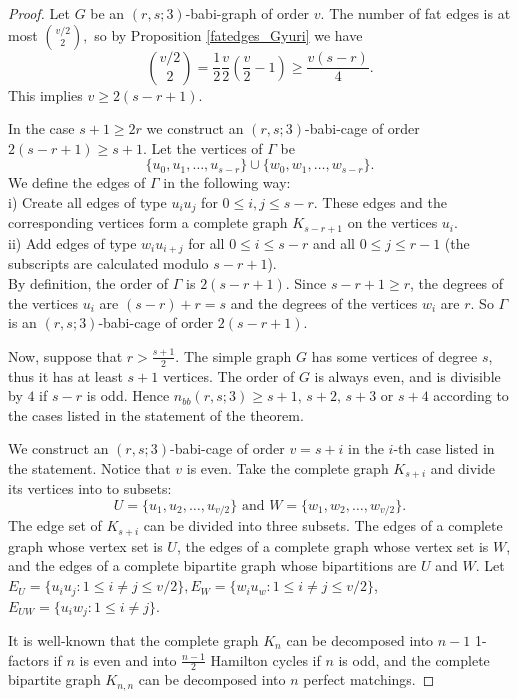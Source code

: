 \documentclass[a4paper,11pt]{article}
\begin{document}
\begin{proof}
Let $G$ be an $(r,s;3)$-babi-graph of order $v.$ 
The number of fat edges is at most ${v/2 \choose 2},$ so by Proposition
\ref{fatedges_Gyuri} we have 
$${v/2 \choose 2}=\frac{1}{2}\frac{v}{2}\left( \frac{v}{2}-1\right) \geq \frac{v(s-r)}{4}.$$
This implies $v\geq 2(s-r+1).$

In the case $s+1 \geq 2r$ we construct an $(r,s;3)$-babi-cage of order $2(s-r+1)\geq s+1$. 
Let the vertices of $\Gamma $ be 
$$\{ u_0,u_1,\dots ,u_{s-r}\}  \cup  \{ w_0,w_1,\dots ,w_{s-r}\}  .$$
We define the edges of $\Gamma $ in the following way:  \\
i) Create all edges of type $u_iu_j$ for $0\leq i,j\leq s-r$. These edges and the corresponding vertices form a complete graph $K_{s-r+1}$ on the vertices $u_i$. \\
ii) Add edges of type $w_iu_{i+j}$ for all $0\leq i\leq s-r $ and all $0\leq j \leq r-1$ (the subscripts are calculated modulo $s-r+1$).   \\
By definition, the order of $\Gamma $  is $2(s-r+1)$.
Since $s-r+1\geq r$, the degrees of the vertices $u_i$ are $(s-r)+r=s$ and 
the degrees of the vertices $w_i$ are $r.$ So $\Gamma $ is an 
$(r,s;3)$-babi-cage of order $2(s-r+1)$.


Now, suppose that $r>\frac{s+1}{2} $.
The simple graph $G$ has some vertices of degree $s$, thus it has at least $s+1$
vertices. The order of $G$ is always even, and is divisible by $4$ if $s-r$ is odd. 
Hence $n_{bb}(r,s;3)\geq s+1, \, s+2, \, s+3$ or $s+4$ according to the cases listed in the statement of the theorem.

We construct an $(r,s;3)$-babi-cage of order $v=s+i$ in the $i$-th case listed in the statement. Notice that $v$ is even. Take 
the complete graph $K_{s+i}$ and divide its vertices into to subsets:
$$U=\{ u_1,u_2,\dots ,u_{v/2}\}  \text{ and }  W=\{ w_1,w_2,\dots ,w_{v/2}\}  .$$
The edge set of $K_{s+i}$ can be divided into three subsets. The edges of a complete graph
whose vertex set is $U$, the edges of a complete graph
whose vertex set is $W$, and the edges of a complete bipartite graph whose bipartitions are $U$
and $W$. Let   
$E_U=\{ u_iu_j \colon 1 \leq i\neq j \leq v/2 \} , E_W=\{ w_iu_w \colon 1 \leq i\neq  j \leq v/2 \} $, \\
$E_{UW}=\{ u_iw_j \colon 1 \leq i\neq j \} .$

 It is well-known that the complete graph $K_n$ can be decomposed into $n-1$ 1-factors if $n$ is even and into $\frac{n-1}{2}$ Hamilton cycles if $n$ is odd, and the complete bipartite graph $K_{n,n}$ can be decomposed into $n$ perfect matchings.


\end{proof}
\end{document}
